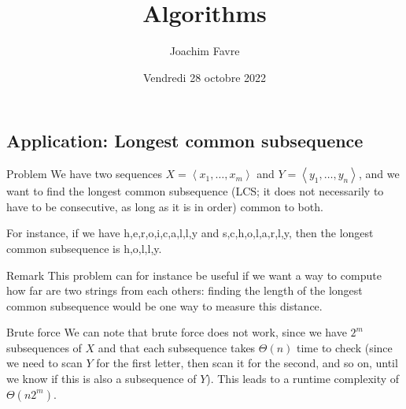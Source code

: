\documentclass[a4paper]{article}
\title{Algorithms}
\author{Joachim Favre}
\date{Vendredi 28 octobre 2022}
\begin{document}
\maketitle


\subsection{Application: Longest common subsequence}

\begin{parag}{Problem}
    We have two sequences $X = \left\langle x_1, \ldots, x_m \right\rangle$ and $Y = \left\langle y_1, \ldots, y_n \right\rangle$, and we want to find the longest common subsequence (LCS; it does not necessarily to have to be consecutive, as long as it is in order) common to both.

    For instance, if we have h,e,r,o,i,c,a,l,l,y and s,c,h,o,l,a,r,l,y, then the longest common subsequence is h,o,l,l,y.

    \begin{subparag}{Remark}
        This problem can for instance be useful if we want a way to compute how far are two strings from each others: finding the length of the longest common subsequence would be one way to measure this distance.
    \end{subparag}
    
\end{parag}

\begin{parag}{Brute force}
    We can note that brute force does not work, since we have $2^m$ subsequences of $X$ and that each subsequence takes $\Theta\left(n\right)$ time to check (since we need to scan $Y$ for the first letter, then scan it for the second, and so on, until we know if this is also a subsequence of $Y$). This leads to a runtime complexity of $\Theta\left(n2^m\right)$.
\end{parag}
   
\end{document}
